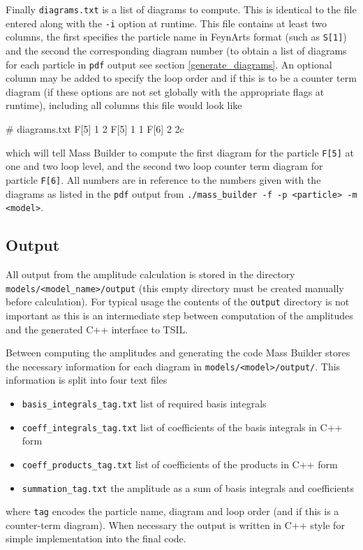 Finally \lstinline{diagrams.txt} is a list of diagrams to compute.  This is identical to the file entered along with the \lstinline{-i} option at runtime.  This file contains at least two columns, the first specifies the particle name in FeynArts format (such as \lstinline{S[1]}) and the second the corresponding diagram number (to obtain a list of diagrams for each particle in \lstinline{pdf} output see section \ref{generate_diagrams}.  An optional column may be added to specify the loop order and if this is to be a counter term diagram (if these options are not set globally with the appropriate flags at runtime), including all columns this file would look like
\begin{lstterm}
# diagrams.txt
F[5]   1   2
F[5]   1   1
F[6]   2   2c
\end{lstterm}
which will tell Mass Builder to compute the first diagram for the particle \lstinline{F[5]} at one and two loop level, and the second two loop counter term diagram for particle \lstinline{F[6]}.  All numbers are in reference to the numbers given with the diagrams as listed in the \lstinline{pdf} output from \lstinline{./mass_builder -f -p <particle> -m <model>}.

\subsection{Output}

All output from the amplitude calculation is stored in the directory \lstinline{models/<model_name>/output} (this empty directory must be created manually before calculation).  For typical usage the contents of the \lstinline{output} directory is not important as this is an intermediate step between computation of the amplitudes and the generated C++ interface to TSIL.

Between computing the amplitudes and generating the code Mass Builder stores the necessary information for each diagram in \lstinline{models/<model>/output/}.  This information is split into four text files
\begin{itemize}
\item \lstinline{basis_integrals_tag.txt} list of required basis integrals
\item \lstinline{coeff_integrals_tag.txt} list of coefficients of the basis integrals in C++ form
\item \lstinline{coeff_products_tag.txt} list of coefficients of the products in C++ form
\item \lstinline{summation_tag.txt} the amplitude as a sum of basis integrals and coefficients
\end{itemize}
where \lstinline{tag} encodes the particle name, diagram and loop order (and if this is a counter-term diagram).  When necessary the output is written in C++ style for simple implementation into the final code.

